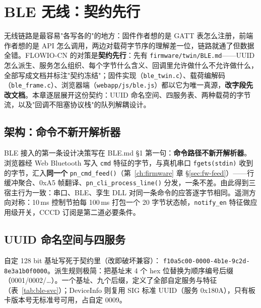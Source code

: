 \chapter{BLE 无线：契约先行}
\label{ch:ble}

无线链路是最容易"各写各的"的地方：固件作者想的是 GATT 表怎么注册，前端作者想的是 API 怎么调用，两边对载荷字节序的理解差一位，链路就通了但数据全错。FLOWIO-CN 的对策是\textbf{契约先行}：先有 \texttt{firmware/twin/BLE.md}——UUID 怎么派生、服务怎么组织、每个字节什么含义、回调里允许做什么不允许做什么，全部写成文档并标注"契约冻结"；固件实现（\texttt{ble\_twin.c}）、载荷编解码（\texttt{ble\_frame.c}）、浏览器端（\texttt{webapp/js/ble.js}）都以它为唯一真源，\textbf{改字段先改文档}。本章逐层展开这份契约：UUID 命名空间、四服务表、两种载荷的字节流，以及"回调不阻塞协议栈"的队列解耦设计。

\section{架构：命令不新开解析器}
\label{sec:ble-arch}

BLE 接入的第一条设计决策写在 BLE.md \S1 第一句：\textbf{命令路径不新开解析器}。浏览器经 Web Bluetooth 写入 \texttt{cmd} 特征的字节，与真机串口 \texttt{fgets(stdin)} 收到的字节，汇入\textbf{同一个} \texttt{pn\_cmd\_feed()}（第~\ref{ch:firmware} 章 \S\ref{sec:fw-feed}）——行缓冲聚合、0xA5 帧翻译、\texttt{pn\_cli\_process\_line()} 分发，一条不差。由此得到三宿主行为一致：串口、BLE、孪生 DLL 对同一条命令的应答逐字节相同。遥测方向对称：10\,ms 控制节拍每 100\,ms 打包一个 20 字节状态帧，\texttt{notify\_en} 特征做应用级开关，CCCD 订阅是第二道必要条件。

\section{UUID 命名空间与四服务}
\label{sec:ble-uuid}

自定 128 bit 基址写死于契约里（改即破坏兼容）：
\texttt{f10a5c00-0000-4b1e-9c2d-8e3a1b0f0000}。派生规则极简：把基址末 4 个 hex 位替换为顺序编号后缀（0001/0002/\dots）。一个基址、九个后缀，定义了全部自定服务与特征（表~\ref{tab:ble-svc}）；DeviceInfo 则复用 SIG 标准 UUID（服务 0x180A），只有板卡版本号无标准号可用，占自定 0009。

